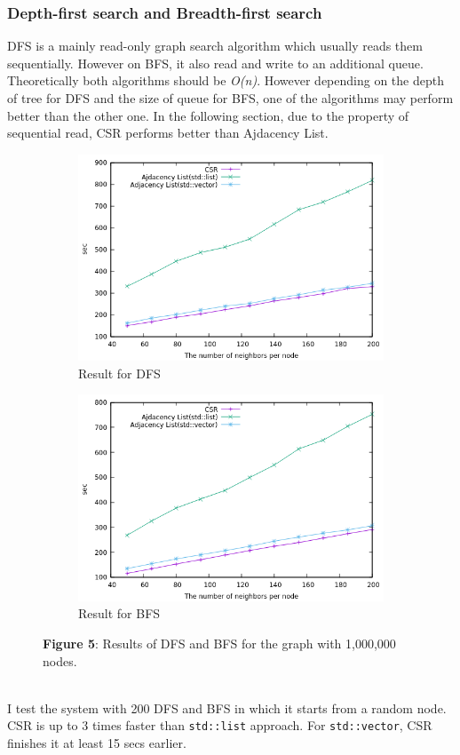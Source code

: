 \documentclass{article}
\begin{document}
\subsubsection*{Depth-first search and Breadth-first search}
DFS is a mainly read-only graph search algorithm which usually reads them sequentially. However on BFS, it also read and write to an additional queue. Theoretically both algorithms should be \textit{O(n)}. However depending on the depth of tree for DFS and the size of queue for BFS, one of the algorithms may perform better than the other one. In the following section, due to the property of sequential read, CSR performs better than Ajdacency List.
\begin{figure}[h]
\begin{subfigure}[h]{0.49\textwidth}
\includegraphics[scale = 0.425]{DFS}
\caption{Result for DFS}\label{fig:figA}
\end{subfigure}
\begin{subfigure}[h]{0.49\textwidth}
\includegraphics[scale = 0.425]{BFS}
\caption{Result for BFS}\label{fig:figB}
\end{subfigure}
\caption*{\textbf{Figure 5}: Results of DFS and BFS for the graph with 1,000,000 nodes.}
\end{figure} \\
 I test the system with 200 DFS and BFS in which it starts from a random node. CSR is up to 3 times faster than \texttt{std::list} approach. For \texttt{std::vector}, CSR finishes it at least 15 secs earlier.
\end{document}
